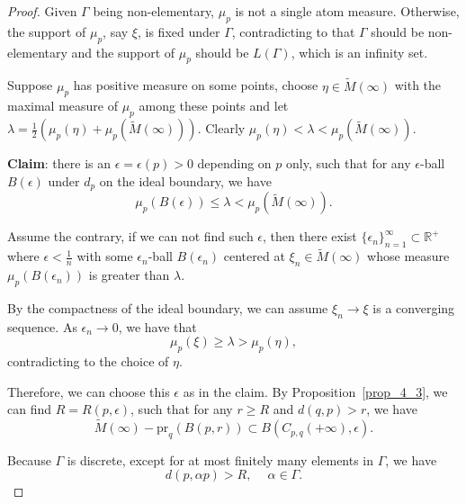 \documentclass[reqno,11pt]{article}
\theoremstyle{definition}
\theoremstyle{remark}
\numberwithin{equation}{section}
\begin{document}
\begin{proof}
	Given $\Gamma$ being non-elementary, $\mu_p$ is not a single atom measure. Otherwise, the support of $\mu_p$, say $\xi$, is fixed under $\Gamma$, contradicting to that $\Gamma$ should be non-elementary and the support of $\mu_p$ should be $L(\Gamma)$, which is an infinity set.

	Suppose $\mu_p$ has positive measure on some points, choose $\eta\in\widetilde{M}(\infty)$ with the maximal measure of $\mu_p$ among these points and let $\lambda=\frac 12(\mu_p(\eta)+\mu_p(\widetilde{M}(\infty)))$. Clearly $\mu_p(\eta)<\lambda<\mu_p(\widetilde{M}(\infty))$.

	\textbf{Claim}: there is an $\epsilon=\epsilon(p)>0$ depending on $p$ only, such that for any $\epsilon$-ball $B(\epsilon)$ under $d_p$ on the ideal boundary, we have
	\begin{displaymath}
		\mu_p(B(\epsilon))\leq\lambda<\mu_p(\widetilde{M}(\infty)).
	\end{displaymath}

	Assume the contrary, if we can not find such $\epsilon$, then there exist ${\{\epsilon_n\}}_{n=1}^\infty\subset\mathbb{R}^+$ where $\epsilon<\frac 1n$ with some $\epsilon_n$-ball $B(\epsilon_n)$ centered at $\xi_n\in\widetilde{M}(\infty)$ whose measure $\mu_p(B(\epsilon_n))$ is greater than $\lambda$.

	By the compactness of the ideal boundary, we can assume $\xi_n\to\xi$ is a converging sequence. As $\epsilon_n\to0$, we have that
	\begin{displaymath}
		\mu_p(\xi)\geq\lambda>\mu_p(\eta),
	\end{displaymath}
	contradicting to the choice of $\eta$.

	Therefore, we can choose this $\epsilon$ as in the claim. By Proposition~\ref{prop_4_3}, we can find $R=R(p,\epsilon)$, such that for any $r\geq R$ and $d(q,p)>r$, we have
	\begin{displaymath}
		\widetilde{M}(\infty)-\text{pr}_q(B(p,r))\subset B(C_{p,q}(+\infty),\epsilon).
	\end{displaymath}

	Because $\Gamma$ is discrete, except for at most finitely many elements in $\Gamma$, we have
	\begin{displaymath}
		d(p,\alpha p)>R,~\quad \alpha\in\Gamma.
	\end{displaymath}


\end{proof}
\end{document}
